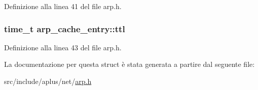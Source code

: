 Definizione alla linea 41 del file arp.\+h.

\hypertarget{structarp__cache__entry_a9e7f6ce0108939a15edffff4aa0fdb5a}{
\subsubsection[{ttl}]{\setlength{\rightskip}{0pt plus 5cm}time\+\_\+t arp\+\_\+cache\+\_\+entry\+::ttl}}\label{structarp__cache__entry_a9e7f6ce0108939a15edffff4aa0fdb5a}


Definizione alla linea 43 del file arp.\+h.



La documentazione per questa struct è stata generata a partire dal seguente file\+:\begin{DoxyCompactItemize}
\item 
src/include/aplus/net/\hyperlink{arp_8h}{arp.\+h}\end{DoxyCompactItemize}
